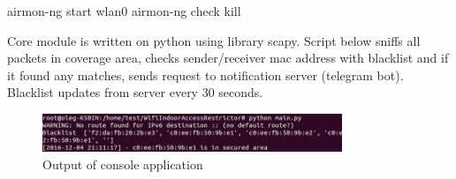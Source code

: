 \documentclass[a4paper,11pt]{article}
\begin{document}
\begin{bashcode}
airmon-ng start wlan0
airmon-ng check kill 
\end{bashcode}

Core module is written on python using library scapy. Script below sniffs all packets in coverage area, checks sender/receiver mac address with blacklist and if it found any matches, sends request to notification server (telegram bot). Blacklist updates from server every 30 seconds.

\begin{figure}[h]
    \centering
    \includegraphics[width=0.8\textwidth]{console}
    \caption{Output of console application}
    \label{fig:console}
\end{figure}
\end{document}
